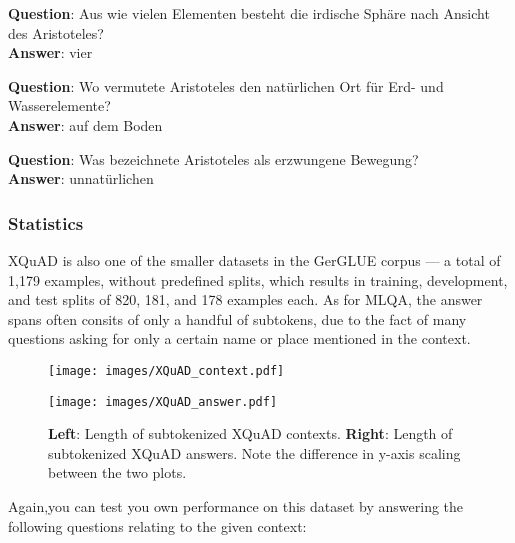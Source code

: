 \begin{examples}
        \textbf{Question}: Aus wie vielen Elementen besteht die irdische Sphäre nach Ansicht des Aristoteles?\\
        \textbf{Answer}: vier

        \textbf{Question}: Wo vermutete Aristoteles den natürlichen Ort für Erd- und Wasserelemente?\\
        \textbf{Answer}: auf dem Boden

        \textbf{Question}: Was bezeichnete Aristoteles als erzwungene Bewegung?\\
        \textbf{Answer}: unnatürlichen
\end{examples}

\subsubsection{Statistics}

XQuAD is also one of the smaller datasets in the GerGLUE corpus --- a total
of 1,179 examples, without predefined splits, which results in training, development, and test
splits of 820, 181, and 178 examples each. As for MLQA, the answer spans often consits of
only a handful of subtokens, due to the fact of many questions asking for only a certain
name or place mentioned in the context.



\begin{figure}
  \begin{minipage}{0.45\linewidth}
  \vspace{0pt}
    \texttt{[image: images/XQuAD\_context.pdf]}
  \end{minipage}
  \hfill
  \begin{minipage}{0.45\linewidth}
  \vspace{0pt}
    \texttt{[image: images/XQuAD\_answer.pdf]}
  \end{minipage}
  \caption[XQuAD Lengths]{\textbf{Left}: Length of subtokenized XQuAD contexts.
                         \textbf{Right}: Length of subtokenized XQuAD answers. Note the difference in y-axis scaling between the two plots.}
\end{figure}

Again,you can test you own performance on this dataset by answering the following questions relating
to the given context:

